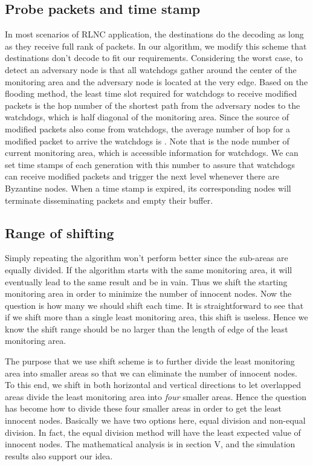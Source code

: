 \documentclass[conference]{IEEEtran}
\begin{document}
\subsection{Probe packets and time stamp} In most scenarios of RLNC application, the destinations do the decoding as long as they receive full rank of packets. In our algorithm, we modify this scheme that destinations don't decode to fit our requirements. Considering the worst case, to detect an adversary node is that all watchdogs gather around the center of the monitoring area and the adversary node is located at the very edge. Based on the flooding method, the least time slot required for watchdogs to receive modified packets is the hop number of the shortest path from the adversary nodes to the watchdogs, which is half diagonal of the monitoring area. Since the source of modified packets also come from watchdogs, the average number of hop for a modified packet to arrive the watchdogs is . Note that  is the node number of current monitoring area, which is accessible information for watchdogs. We can set time stamps of each generation with this number  to assure that watchdogs can receive modified packets and trigger the next level whenever there are Byzantine nodes. When a time stamp is expired, its corresponding nodes will terminate disseminating packets and empty their buffer.
\subsection{Range of shifting}
Simply repeating the algorithm won't perform better since the sub-areas are equally divided. If the algorithm starts with the same monitoring area, it will eventually lead to the same result and be in vain. Thus we shift the starting monitoring area in order to minimize the number of innocent nodes. Now the question is how many we should shift each time. It is straightforward to see that if we shift more than a single least monitoring area, this shift is useless. Hence we know the shift range should be no larger than the length of edge of the least monitoring area. 


The purpose that we use shift scheme is to further divide the least monitoring area into smaller areas so that we can eliminate the number of innocent nodes. To this end, we shift in both horizontal and vertical directions to let overlapped areas divide the least monitoring area into \emph{four} smaller areas. Hence the question has become how to divide these four smaller areas in order to get the least innocent nodes. Basically we have two options here, equal division and non-equal division. In fact, the equal division method will have the least expected value of innocent nodes. The mathematical analysis is in section V, and the simulation results also support our idea.
\end{document}
